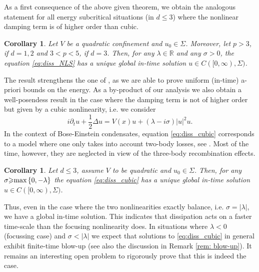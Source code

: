 \documentclass[a4paper,leqno]{amsart}
\theoremstyle{plain}
\newtheorem{corollary}[theorem]{Corollary}
\theoremstyle{definition}
\numberwithin{equation}{section}
\begin{document}
As a first consequence of the above given theorem, we obtain the analogous statement for all energy subcritical situations (in $d{\leqslant} 3$)
where the nonlinear damping term is of higher order than cubic.

\begin{corollary}\label{cor:sub}
Let $V$ be a quadratic confinement and $u_0 \in \Sigma$. Moreover, let $p > 3$, if $d=1,2$ and $3< p < 5$, if $ d=3$. Then, for any $\lambda \in {{\mathbb R}}$ and any $\sigma >0$, the equation \eqref{eq:diss_NLS} has a unique
global in-time solution $u \in C([0, \infty), \Sigma)$.
\end{corollary}
The result strengthens the one of \cite{PSS}, as we are able to prove uniform (in-time) a-priori bounds
on the energy. As a by-product of our analysis we also obtain a well-posendess result in the case where the damping term 
is not of higher order but given by a cubic nonlinearity, i.e. we consider
\begin{equation}\label{eq:diss_cubic}
i{\partial}_t u + {\frac{1}{2}}\Delta u = V(x) u +(\lambda -i\sigma)|u |^2 u .
\end{equation}
In the context of Bose-Einstein condensates, equation \eqref{eq:diss_cubic} corresponds to a model 
where one only takes into account two-body losses, see \cite{A, SU}.
Most of the time, however, they are neglected in view of the three-body recombination effects.
\begin{corollary}\label{cor:cubic}
Let $d{\leqslant} 3$, assume $V$ to be quadratic and $u_0 \in \Sigma$. Then, for any $\sigma {\geqslant} \text{\rm max}\, \{0, -\lambda\}$ the equation \eqref{eq:diss_cubic} has a unique
global in-time solution $u \in C([0, \infty), \Sigma)$.
\end{corollary}
Thus, even in the case where the two nonlinearities exactly balance, i.e. $\sigma = |\lambda|$, we have a global in-time solution. 
This indicates that dissipation acts on a faster time-scale than the focusing nonlinearity does.
In situations where $\lambda <0$ (focussing case) and $\sigma < |\lambda|$ we expect that solutions to \eqref{eq:diss_cubic} in general exhibit finite-time blow-up (see also the discussion in 
Remark \ref{rem: blow-up}). 
It remains an interesting open problem to rigorously prove that this is indeed the case. 
\end{document}
